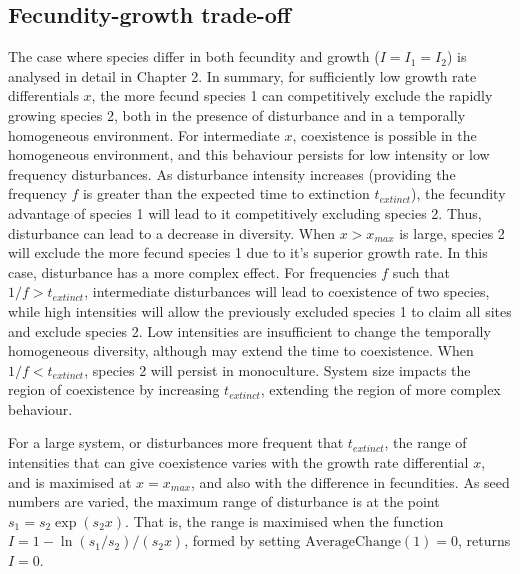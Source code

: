 \documentclass[preprint,10pt,reqno]{amsart}
\begin{document}
\subsection{Fecundity-growth trade-off}
The case where species differ in both fecundity and growth ($I=I_1=I_2$) is analysed in detail in Chapter 2. In summary, for sufficiently low growth rate differentials $x$,  the more fecund species 1 can competitively exclude the rapidly growing species 2, both in the presence of disturbance and in a temporally homogeneous environment. For intermediate $x$, coexistence is possible in the homogeneous environment, and this behaviour persists for low intensity or low frequency disturbances. As disturbance intensity increases (providing the frequency $f$ is greater than the expected time to extinction $t_{extinct}$), the fecundity advantage of species 1 will lead to it competitively excluding species 2. Thus, disturbance can lead to a decrease in diversity. When $x>x_{max}$ is large, species 2 will exclude the more fecund species 1 due to it's superior growth rate. In this case, disturbance has a more complex effect. For frequencies $f$ such that $1/f > t_{extinct}$, intermediate disturbances will lead to coexistence of two species, while high intensities will allow the previously excluded species 1 to claim all sites and exclude species 2. Low intensities are insufficient to change the temporally homogeneous diversity, although may extend the time to coexistence. When $1/f < t_{extinct}$, species 2 will persist in monoculture. System size impacts the region of coexistence by increasing $t_{extinct}$, extending the region of more complex behaviour.

For a large system, or disturbances more frequent that $t_{extinct}$, the range of intensities that can give coexistence varies with the growth rate differential $x$, and is maximised at $x=x_{max}$, and also with the difference in fecundities. As seed numbers are varied, the maximum range of disturbance is at the point $s_1=s_2\exp(s_2x)$. That is, the range is maximised when the function $I=1-\ln(s_1/s_2)/(s_2x)$, formed by setting $\text{AverageChange}(1)=0$, returns $I=0$.
\end{document}
